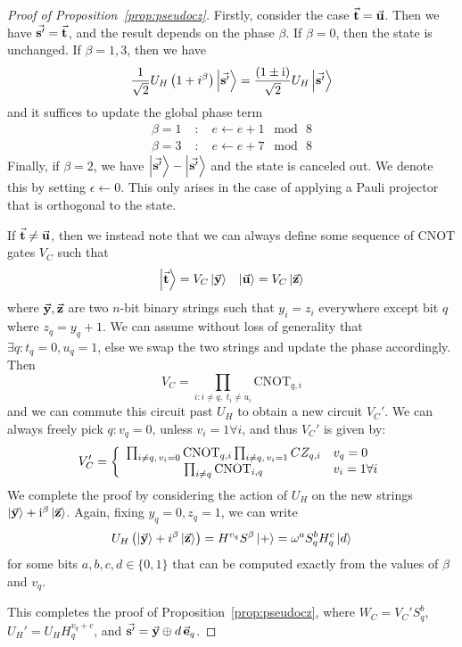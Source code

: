 \begin{proof}[Proof of Proposition~\ref{prop:pseudocz}]
Firstly, consider the case $\va{t}=\va{u}$. Then we have $\va{s'}=\va{t}$, and the result depends on the phase $\beta$. If $\beta=0$, then the state is unchanged. If $\beta =1,3$, then we have
\[\frac{1}{\sqrt{2}}U_{H}\left(1+i^{\beta}\right)\ket{\va{s'}} = \frac{\left(1\pm \mathrm{i}\right)}{\sqrt{2}}U_{H}\ket{\va{s'}}\]
and it suffices to update the global phase term
\[
\begin{array}{rcl}
\beta = 1 & \;:\; & e\gets e+1\;\bmod\, 8\\
\beta=3 & \;:\; & e\gets e+7\;\bmod\,8
\end{array}\]
Finally, if $\beta=2$, we have $\ket{\va{s'}}-\ket{\va{s'}}$ and the state is canceled out. We denote this by setting $\epsilon\gets 0$. This only arises in the case of applying a Pauli projector that is orthogonal to the state.\par
If $\va{t}\neq \va{u}$, then we instead note that we can always define some sequence of CNOT gates $V_{C}$ such that
\[
\begin{array}{lr}
\ket{\va{t}}=V_{C}\ket{\va{y}} & \ket{\va{u}} = V_{C}\ket{\va{z}}
\end{array}
\]
where $\va{y},\va{z}$ are two $n$-bit binary strings such that $y_{i}=z_{i}$ everywhere except bit $q$ where $z_{q}=y_{q} + 1$. We can assume without loss of generality that $\exists q:t_{q}=0,u_{q}=1$, else we swap the two strings and update the phase accordingly. Then
\[V_{C} = \prod_{i: i\neq q,\;t_{i}\neq u_{i}}\text{CNOT}_{q,i}\]
and we can commute this circuit past $U_{H}$ to obtain a new circuit $V_{C}'$. We can always freely pick $q:v_{q}=0$, unless $v_{i}=1\forall i$, and thus $V_{C}'$ is given by:
\[V_{C}' = \left\{ \begin{array}{c l}
\prod_{i\neq q,\,v_{i}=0} \text{CNOT}_{q,i}\prod_{i\neq q,\,v_{i}=1}CZ_{q,i} & v_{q}=0 \\ 
\prod_{i\neq q} \text{CNOT}_{i,q} & v_{i}=1 \forall i \\
\end{array} \right.
\]
We complete the proof by considering the action of $U_{H}$ on the new strings $\ket{\va{y}}+\mathrm{i}^{\beta}\ket{\va{z}}$. Again, fixing $y_{q}=0,z_{q}=1$, we can write
\[
U_{H}\left(\ket{\va{y}}+i^{\beta}\ket{\va{z}}\right) = H^{v_{q}} S^{\beta}\ket{+} = \omega^{a}S_{q}^{b}H_{q}^{c}\ket{d}
\]
for some bits $a,b,c,d\in\{0,1\}$ that can be computed exactly from the values of $\beta$ and $v_{q}$.\par
This completes the proof of Proposition~\ref{prop:pseudocz}, where $W_{C}=V_{C}'S_{q}^{b}$, $U_{H}'=U_{H}H^{v_{q}+c}_{q}$, and $\va{s'}=\va{y}\oplus d\,\va{e}_{q}$.
\end{proof}
